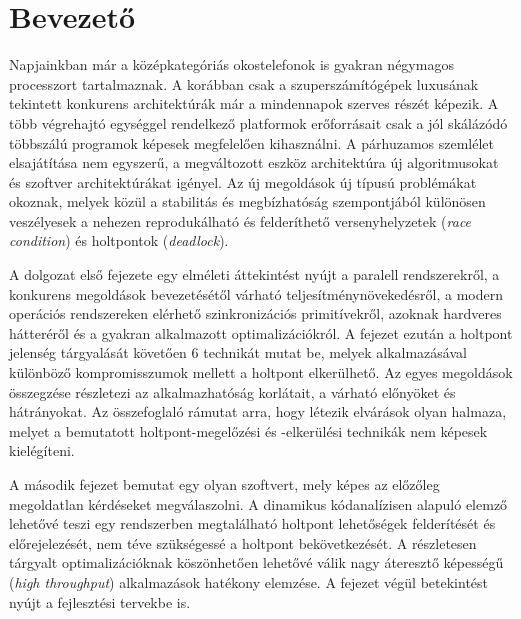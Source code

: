 \chapter*{Bevezető}


Napjainkban már a középkategóriás okostelefonok is gyakran négymagos processzort tartalmaznak. A korábban csak a szuperszámítógépek luxusának tekintett konkurens architektúrák már a mindennapok szerves részét képezik. A több végrehajtó egységgel rendelkező platformok erőforrásait csak a jól skálázódó többszálú programok képesek megfelelően kihasználni. A párhuzamos szemlélet elsajátítása nem egyszerű, a megváltozott eszköz architektúra új algoritmusokat és szoftver architektúrákat igényel. Az új megoldások új típusú problémákat okoznak, melyek közül a stabilitás és megbízhatóság szempontjából különösen veszélyesek a nehezen reprodukálható és felderíthető versenyhelyzetek (\emph{race condition}) és holtpontok (\emph{deadlock}).

A dolgozat első fejezete egy elméleti áttekintést nyújt a paralell rendszerekről, a konkurens megoldások bevezetésétől várható teljesítménynövekedésről, a modern operációs rendszereken elérhető szinkronizációs primitívekről, azoknak hardveres hátteréről és a gyakran alkalmazott optimalizációkról. A fejezet ezután a holtpont jelenség tárgyalását követően 6 technikát mutat be, melyek alkalmazásával különböző kompromisszumok mellett a holtpont elkerülhető. Az egyes megoldások összegzése részletezi az alkalmazhatóság korlátait, a várható előnyöket és hátrányokat. Az összefoglaló rámutat arra, hogy létezik elvárások olyan halmaza, melyet a bemutatott holtpont-megelőzési és -elkerülési technikák nem képesek kielégíteni.

A második fejezet bemutat egy olyan szoftvert, mely képes az előzőleg megoldatlan kérdéseket megválaszolni. A dinamikus kódanalízisen alapuló elemző lehetővé teszi egy rendszerben megtalálható holtpont lehetőségek felderítését és előrejelezését, nem téve szükségessé a holtpont bekövetkezését. A részletesen tárgyalt optimalizációknak köszönhetően lehetővé válik nagy áteresztő képességű (\emph{high throughput}) alkalmazások hatékony elemzése. A fejezet végül betekintést nyújt a fejlesztési tervekbe is.
